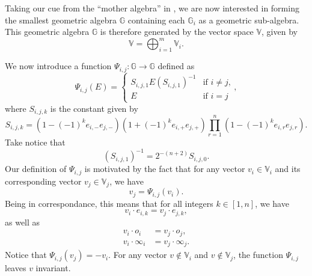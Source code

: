 \documentclass{ecgd-l}
\theoremstyle{definition}
\theoremstyle{remark}
\numberwithin{equation}{section}
\newcommand{\G}{\mathbb{G}}
\newcommand{\V}{\mathbb{V}}
\newcommand{\nvai}{\infty}
\newcommand{\nvao}{o}
\begin{document}
Taking our cue from the ``mother algebra'' in \cite{},
we are now interested in forming the smallest geometric algebra $\G$
containing each $\G_i$ as a geometric sub-algebra.  This geometric
algebra $\G$ is therefore generated by the vector space $\V$, given by
\begin{equation*}
\V=\bigoplus_{i=1}^m \V_i.
\end{equation*}

We now introduce a function $\Psi_{i,j}:\G\to\G$ defined as
\begin{equation*}
\Psi_{i,j}(E) = \left\{\begin{array}{ll}
S_{i,j,1}E(S_{i,j,1})^{-1} & \mbox{if $i\neq j$,} \\
E & \mbox{if $i=j$}\end{array}\right.,
\end{equation*}
where $S_{i,j,k}$ is the constant given by
\begin{equation}\label{equ_S}
S_{i,j,k} = \left(1-(-1)^ke_{i,-}e_{j,-}\right)\left(1+(-1)^ke_{i,+}e_{j,+}\right)\prod_{r=1}^n\left(1-(-1)^ke_{i,r}e_{j,r}\right).
\end{equation}
Take notice that
\begin{equation*}
(S_{i,j,1})^{-1} = 2^{-(n+2)}S_{i,j,0}.
\end{equation*}
Our definition of $\Psi_{i,j}$ is motivated by the fact that for any vector $v_i\in\V_i$ and its
corresponding vector $v_j\in\V_j$, we have
\begin{equation*}
v_j = \Psi_{i,j}(v_i).
\end{equation*}
Being in correspondance, this means that for all integers $k\in[1,n]$,
we have
\begin{equation*}
v_i\cdot e_{i,k}=v_j\cdot e_{j,k},
\end{equation*}
as well as
\begin{align*}
v_i\cdot\nvao_i &= v_j\cdot\nvao_j, \\
v_i\cdot\nvai_i &= v_j\cdot\nvai_j.
\end{align*}
Notice that $\Psi_{i,j}(v_j)=-v_i$.
For any vector $v\not\in\V_i$ and $v\not\in\V_j$, the function $\Psi_{i,j}$ leaves $v$ invariant.
\end{document}
